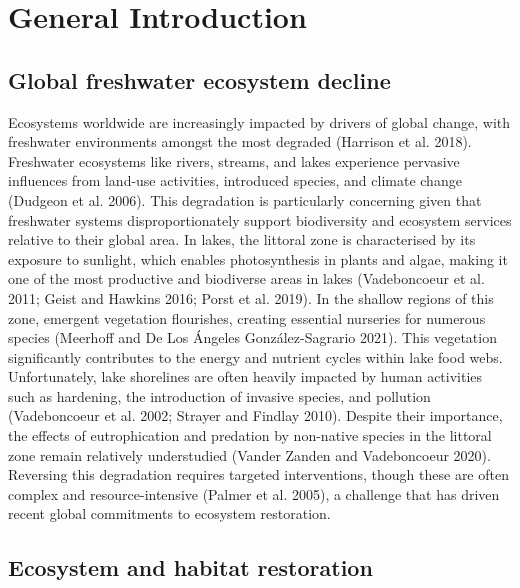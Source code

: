 \documentclass[
  12pt,
  a4paper,
]{scrbook}
\begin{document}
\afterpage{\pagecolor{thesiscream}}

\newpage{}


\chapter{General Introduction}\label{general-introduction-1}

\section{Global freshwater ecosystem
decline}\label{global-freshwater-ecosystem-decline}

Ecosystems worldwide are increasingly impacted by drivers of global
change, with freshwater environments amongst the most degraded (Harrison
et al. 2018). Freshwater ecosystems like rivers, streams, and lakes
experience pervasive influences from land-use activities, introduced
species, and climate change (Dudgeon et al. 2006). This degradation is
particularly concerning given that freshwater systems disproportionately
support biodiversity and ecosystem services relative to their global
area. In lakes, the littoral zone is characterised by its exposure to
sunlight, which enables photosynthesis in plants and algae, making it
one of the most productive and biodiverse areas in lakes (Vadeboncoeur
et al. 2011; Geist and Hawkins 2016; Porst et al. 2019). In the shallow
regions of this zone, emergent vegetation flourishes, creating essential
nurseries for numerous species (Meerhoff and De Los Ángeles
González-Sagrario 2021). This vegetation significantly contributes to
the energy and nutrient cycles within lake food webs. Unfortunately,
lake shorelines are often heavily impacted by human activities such as
hardening, the introduction of invasive species, and pollution
(Vadeboncoeur et al. 2002; Strayer and Findlay 2010). Despite their
importance, the effects of eutrophication and predation by non-native
species in the littoral zone remain relatively understudied (Vander
Zanden and Vadeboncoeur 2020). Reversing this degradation requires
targeted interventions, though these are often complex and
resource-intensive (Palmer et al. 2005), a challenge that has driven
recent global commitments to ecosystem restoration.

\section{Ecosystem and habitat
restoration}\label{ecosystem-and-habitat-restoration}
\end{document}

